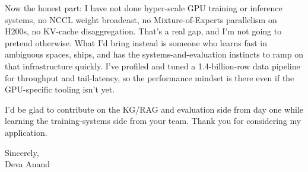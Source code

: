 \documentclass[letterpaper,11pt]{article}
\begin{document}
Now the honest part: I have not done hyper-scale GPU training or inference systems, no NCCL weight broadcast, no Mixture-of-Experts parallelism on H200s, no KV-cache disaggregation. That's a real gap, and I'm not going to pretend otherwise. What I'd bring instead is someone who learns fast in ambiguous spaces, ships, and has the systems-and-evaluation instincts to ramp on that infrastructure quickly. I've profiled and tuned a 1.4-billion-row data pipeline for throughput and tail-latency, so the performance mindset is there even if the GPU-specific tooling isn't yet.

I'd be glad to contribute on the KG/RAG and evaluation side from day one while learning the training-systems side from your team. Thank you for considering my application.

\vspace{8pt}
Sincerely, \\
Deva Anand
\end{document}
